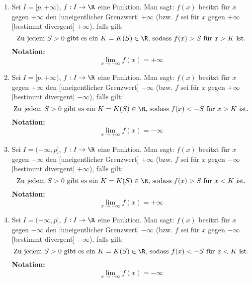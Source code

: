 \begin{enumerate}[leftmargin=*]
    \item Sei $I = [p, +\infty)$, $f: I \to \R$ eine Funktion. Man sagt: $f(x)$ besitzt für $x$ gegen $+\infty$ den [uneigentlicher Grenzwert] $+\infty$ (bzw. $f$ sei für $x$ gegen $+\infty$ [bestimmt divergent] $+\infty$), falls gilt: $$\text{Zu jedem $S > 0$ gibt es ein $K = K(S) \in \R$, sodass $f(x) > S$ für $x > K$ ist.}$$ \textbf{Notation:} $$\lim_{x \to -\infty} f(x) = +\infty$$
    \item Sei $I = [p, +\infty)$, $f: I \to \R$ eine Funktion. Man sagt: $f(x)$ besitzt für $x$ gegen $+\infty$ den [uneigentlicher Grenzwert] $-\infty$ (bzw. $f$ sei für $x$ gegen $+\infty$ [bestimmt divergent] $-\infty$), falls gilt: $$\text{Zu jedem $S > 0$ gibt es ein $K = K(S) \in \R$, sodass $f(x) < -S$ für $x > K$ ist.}$$ \textbf{Notation:} $$\lim_{x \to +\infty} f(x) = -\infty$$
    \item Sei $I = (-\infty, p]$, $f: I \to \R$ eine Funktion. Man sagt: $f(x)$ besitzt für $x$ gegen $-\infty$ den [uneigentlicher Grenzwert] $+\infty$ (bzw. $f$ sei für $x$ gegen $-\infty$ [bestimmt divergent] $+\infty$), falls gilt: $$\text{Zu jedem $S > 0$ gibt es ein $K = K(S) \in \R$, sodass $f(x) > S$ für $x < K$ ist.}$$ \textbf{Notation:} $$\lim_{x \to -\infty} f(x) = +\infty$$
    \item Sei $I = (-\infty, p]$, $f: I \to \R$ eine Funktion. Man sagt: $f(x)$ besitzt für $x$ gegen $-\infty$ den [uneigentlicher Grenzwert] $-\infty$ (bzw. $f$ sei für $x$ gegen $-\infty$ [bestimmt divergent] $-\infty$), falls gilt: $$\text{Zu jedem $S > 0$ gibt es ein $K = K(S) \in \R$, sodass $f(x) < -S$ für $x < K$ ist.}$$ \textbf{Notation:} $$\lim_{x \to -\infty} f(x) = -\infty$$
\end{enumerate}